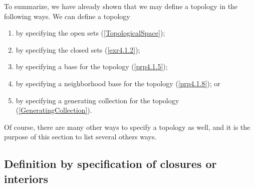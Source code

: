 To summarize, we have already shown that we may define a topology in the following ways.  We can define a topology
\begin{enumerate}
\item by specifying the open sets (\cref{TopologicalSpace});
\item by specifying the closed sets (\cref{exr4.1.2});
\item by specifying a base for the topology (\cref{prp4.1.5});
\item by specifying a neighborhood base for the topology (\cref{prp4.1.8}); or
\item by specifying a generating collection for the topology (\cref{GeneratingCollection}).
\end{enumerate}
Of course, there are many other ways to specify a topology as well, and it is the purpose of this section to list several others ways.

\subsection{Definition by specification of closures or interiors}

